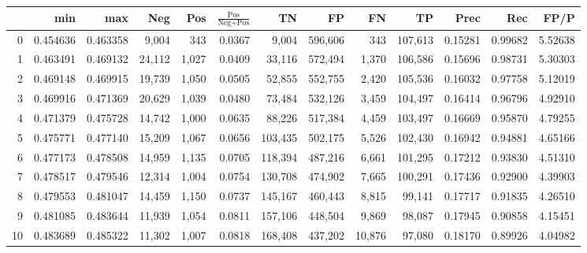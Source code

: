 \begin{tabular}{rrrrrrrrrrrrr}
\toprule
{} &       min &       max &     Neg &    Pos & $\frac{\text{Pos}}{\text{Neg}+\text{Pos}}$ &       TN &       FP &       FN &       TP &     Prec &      Rec &     FP/P \\
\midrule
0  &  0.454636 &  0.463358 &   9,004 &    343 &                                     0.0367 &    9,004 &  596,606 &      343 &  107,613 &  0.15281 &  0.99682 &  5.52638 \\
1  &  0.463491 &  0.469132 &  24,112 &  1,027 &                                     0.0409 &   33,116 &  572,494 &    1,370 &  106,586 &  0.15696 &  0.98731 &  5.30303 \\
2  &  0.469148 &  0.469915 &  19,739 &  1,050 &                                     0.0505 &   52,855 &  552,755 &    2,420 &  105,536 &  0.16032 &  0.97758 &  5.12019 \\
3  &  0.469916 &  0.471369 &  20,629 &  1,039 &                                     0.0480 &   73,484 &  532,126 &    3,459 &  104,497 &  0.16414 &  0.96796 &  4.92910 \\
4  &  0.471379 &  0.475728 &  14,742 &  1,000 &                                     0.0635 &   88,226 &  517,384 &    4,459 &  103,497 &  0.16669 &  0.95870 &  4.79255 \\
5  &  0.475771 &  0.477140 &  15,209 &  1,067 &                                     0.0656 &  103,435 &  502,175 &    5,526 &  102,430 &  0.16942 &  0.94881 &  4.65166 \\
6  &  0.477173 &  0.478508 &  14,959 &  1,135 &                                     0.0705 &  118,394 &  487,216 &    6,661 &  101,295 &  0.17212 &  0.93830 &  4.51310 \\
7  &  0.478517 &  0.479546 &  12,314 &  1,004 &                                     0.0754 &  130,708 &  474,902 &    7,665 &  100,291 &  0.17436 &  0.92900 &  4.39903 \\
8  &  0.479553 &  0.481047 &  14,459 &  1,150 &                                     0.0737 &  145,167 &  460,443 &    8,815 &   99,141 &  0.17717 &  0.91835 &  4.26510 \\
9  &  0.481085 &  0.483644 &  11,939 &  1,054 &                                     0.0811 &  157,106 &  448,504 &    9,869 &   98,087 &  0.17945 &  0.90858 &  4.15451 \\
10 &  0.483689 &  0.485322 &  11,302 &  1,007 &                                     0.0818 &  168,408 &  437,202 &   10,876 &   97,080 &  0.18170 &  0.89926 &  4.04982 \\

\end{tabular}
